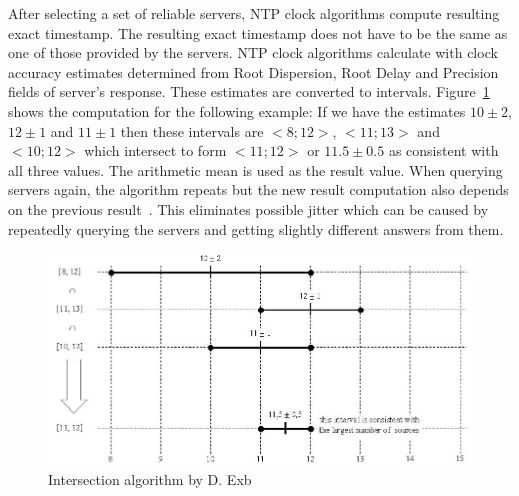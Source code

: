 After selecting a set of reliable servers, NTP clock algorithms compute resulting exact timestamp.
The resulting exact timestamp does not have to be the same
as one of those provided by the servers.
NTP clock algorithms calculate with clock accuracy estimates
determined from Root Dispersion, Root Delay and Precision fields of server's response.
These estimates are converted to intervals.
Figure~\ref{fig:ntp-intersection} shows the computation for the following example:
If we have the estimates $10 \pm 2$, $12 \pm 1$ and $11 \pm 1$
then these intervals are $<8; 12>$, $<11; 13>$ and $<10; 12>$ which
intersect to form $<11; 12>$ or $11.5 \pm 0.5$ as consistent with all three values.
The arithmetic mean is used as the result value.
When querying servers again, the algorithm repeats but the new result computation
also depends on the previous result~\cite{rfc5905,ntp-history}.
This eliminates possible jitter which can be caused by repeatedly querying the servers
and getting slightly different answers from them.

\begin{figure}
	\centering
	\includegraphics[width=13cm,keepaspectratio]{fig/Marzullo_example-1.jpg}
	\caption{Intersection algorithm by D. Exb}
	\label{fig:ntp-intersection}
	\bigskip
\end{figure}

